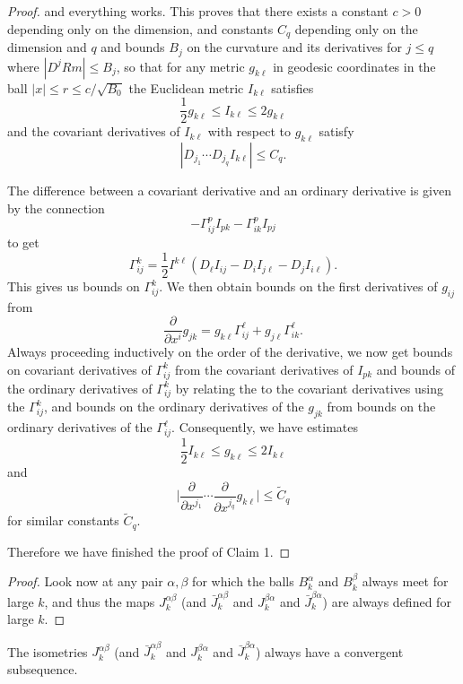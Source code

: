 \begin{proof}
\noindent and everything works. This proves that there exists a
constant $c>0$ depending only on the dimension, and constants
$C_q$ depending only on the dimension and $q$ and bounds $B_j$ on
the curvature and its derivatives for $j \leq q$ where $|D^jRm|
\leq B_j$, so that for any metric $g_{k \ell}$ in geodesic
coordinates in the ball $|x| \leq r \leq c/ \sqrt{B_0}$ the
Euclidean metric $I_{k \ell}$ satisfies
$$
\frac{1}{2} g_{k \ell}\leq I_{k \ell} \leq 2g_{k \ell}
$$
and the covariant derivatives of $I_{k \ell}$ with respect to
$g_{k \ell}$ satisfy
$$
|D_{j_1} \cdots D_{j_q}I_{k \ell}| \leq C_q.
$$

The difference between a covariant derivative and an ordinary
derivative is given by the connection
$$
-\Gamma^p_{ij}I_{pk} - \Gamma^p_{ik} I_{pj}
$$
to get
$$
\Gamma^k_{ij} = \frac{1}{2} I^{k \ell}(D_\ell I_{ij} - D_iI_{j
\ell} - D_j I_{i \ell}).
$$
This gives us bounds on $\Gamma^k_{ij}$. We then obtain bounds on
the first derivatives of $g_{ij}$ from
$$
\frac{\partial}{\partial x^i} g_{jk} = g_{k \ell} \Gamma^\ell_{ij}
+ g_{j \ell} \Gamma^\ell_{ik}.
$$
Always proceeding inductively on the order of the derivative, we
now get bounds on covariant derivatives of $\Gamma^k_{ij}$ from
the covariant derivatives of $I_{pk}$ and bounds of the ordinary
derivatives of $\Gamma^k_{ij}$ by relating the to the covariant
derivatives using the $\Gamma^k_{ij}$, and bounds on the ordinary
derivatives of the $g_{jk}$ from bounds on the ordinary
derivatives of the $\Gamma^\ell_{ij}$. Consequently, we have
estimates
$$
\frac{1}{2} I_{k \ell} \leq g_{k \ell} \leq 2I_{k \ell}
$$
and
$$
\Big| \frac{\partial}{\partial x^{j_1}} \cdots
\frac{\partial}{\partial x^{j_q}} g_{k \ell} \Big| \leq
\tilde{C}_q
$$
for similar constants $\tilde{C}_q$.

Therefore we have finished the proof of Claim 1.
\end{proof}
\begin{proof}

Look now at any pair $\alpha, \beta$ for which the balls
$B_k^{\alpha}$ and $B_k^{\beta}$ always meet for large $k$, and
thus the maps $J_k^{\alpha\beta}$ (and $\bar J_k^{\alpha\beta}$
and $J_k^{\beta\alpha}$ and $\bar J_k^{\beta \alpha}$) are always
defined for large $k$.

\end{proof}
\begin{proposition}
  \label{prop:cz-transition-isometry-subsequence-convergence}
The isometries $J_k^{\alpha\beta}$
(and $\bar J_k^{\alpha\beta}$ and $J_k^{\beta\alpha}$ and $\bar
J_k^{\beta\alpha}$) always have a convergent subsequence. \vskip
0.2cm
\end{proposition}
